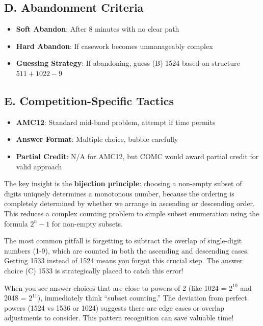 \documentclass[]{article}
\begin{document}
\begin{competitionbox}
\subsection*{D. Abandonment Criteria}
\begin{itemize}[leftmargin=*]
    \item \textbf{Soft Abandon}: After 8 minutes with no clear path
    \item \textbf{Hard Abandon}: If casework becomes unmanageably complex
    \item \textbf{Guessing Strategy}: If abandoning, guess (B) 1524 based on structure $511 + 1022 - 9$
\end{itemize}

\subsection*{E. Competition-Specific Tactics}
\begin{itemize}[leftmargin=*]
    \item \textbf{AMC12}: Standard mid-band problem, attempt if time permits
    \item \textbf{Answer Format}: Multiple choice, bubble carefully
    \item \textbf{Partial Credit}: N/A for AMC12, but COMC would award partial credit for valid approach
\end{itemize}
\end{competitionbox}

\begin{keyinsightbox}
The key insight is the \textbf{bijection principle}: choosing a non-empty subset of digits uniquely determines a monotonous number, because the ordering is completely determined by whether we arrange in ascending or descending order. This reduces a complex counting problem to simple subset enumeration using the formula $2^n - 1$ for non-empty subsets.
\end{keyinsightbox}

\begin{warningbox}
The most common pitfall is forgetting to subtract the overlap of single-digit numbers (1-9), which are counted in both the ascending and descending cases. Getting 1533 instead of 1524 means you forgot this crucial step. The answer choice (C) 1533 is strategically placed to catch this error!
\end{warningbox}

\begin{tipbox}
When you see answer choices that are close to powers of 2 (like 1024 = $2^{10}$ and 2048 = $2^{11}$), immediately think ``subset counting.'' The deviation from perfect powers (1524 vs 1536 or 1024) suggests there are edge cases or overlap adjustments to consider. This pattern recognition can save valuable time!
\end{tipbox}
\end{document}

